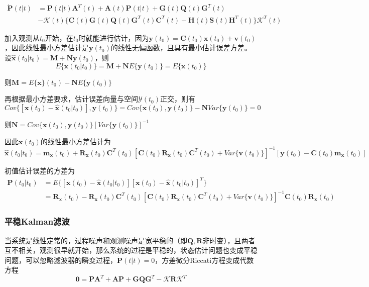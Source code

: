 \documentclass[11pt,a4paper]{ctexart}
\begin{document}
            \begin{align*}
            \bm{\dot P}(t|t)&=\bm P(t|t)\bm A^T(t)+\bm A(t)\bm P(t|t)+\bm G(t)\bm Q(t)\bm G^T(t)\\
            &-\mathscr{K}(t)\{\bm C(t)\bm G(t)\bm Q(t)\bm G^T(t)\bm C^T(t)+\bm H(t)\bm S(t)\bm H^T(t)\}\mathscr{K}^T(t)
            \end{align*}

            加入观测从$t_0$开始，在$t_0$时就能进行估计，因为$\bm y(t_0)=\bm C(t_0)\bm x(t_0)+\bm v(t_0)$，因此线性最小方差估计是$\bm y(t_0)$的线性无偏函数，且具有最小估计误差方差。设$\bm{\hat x}(t_0|t_0)=\bm M+\bm{Ny}(t_0)$，则
            \[
            E\{\bm{\hat x}(t_0|t_0)\}=\bm M+\bm N E\{\bm y(t_0)\}=E\{\bm x(t_0)\}
            \]

            则$\bm M=E\{\bm x\}(t_0)-\bm NE\{\bm y(t_0)\}$

            再根据最小方差要求，估计误差向量与空间$\mathscr{Y}(t_0)$正交，则有
            \[
            Cov\{[\bm x(t_0)-\bm{\hat x}(t_0|t_0)],\bm y(t_0)\}=Cov\{\bm x(t_0),\bm y(t_0)\}-\bm NVar\{\bm y(t_0)\}=0
            \]

            则$\bm N=Cov\{\bm x(t_0),\bm y(t_0)\}[Var\{\bm y(t_0)\}]^{-1}$

            因此$\bm x(t_0)$的线性最小方差估计为
            \[
            \bm{\hat x}(t_0|t_0)=\bm{m_x}(t_0)+\bm{R_x}(t_0)\bm C^T(t_0)[\bm C(t_0)\bm{R_x}(t_0)\bm C^T(t_0)+Var\{\bm v(t_0)\}]^{-1}[\bm y(t_0)-\bm C(t_0)\bm{m_x}(t_0)]
            \]

            初值估计误差的方差为
            \begin{align*}
            \bm P(t_0|t_0)&=E\{[\bm x(t_0)-\bm{\hat x}(t_0|t_0)][\bm x(t_0)-\bm{\hat x}(t_0|t_0)]^T\}\\
            &=\bm{R_x}(t_0)-\bm{R_x}(t_0)\bm C^T(t_0)[\bm C(t_0)\bm{R_x}(t_0)\bm C^T(t_0)+Var\{\bm v(t_0)\}]^{-1}\bm C(t_0)\bm{R_x}(t_0)
            \end{align*}
        \subsubsection{平稳Kalman滤波}
            当系统是线性定常的，过程噪声和观测噪声是宽平稳的（即$\bm Q,\bm R$非时变），且两者互不相关，观测很早就开始，那么系统的过程是平稳的，状态估计问题也变成平稳问题，可以忽略滤波器的瞬变过程，$\bm{\dot P}(t|t)=0$，方差微分Riccati方程变成代数方程
            \[
            \bm 0=\bm{PA}^T+\bm{AP}+\bm{GQG}^T-\mathscr{K}\bm R\mathscr{K}^T
            \]
\end{document}
